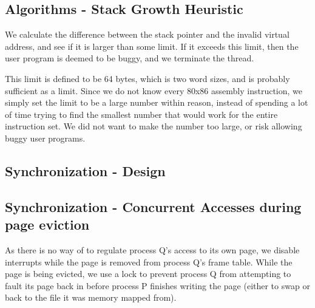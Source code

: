 
\subsection{Algorithms - Stack Growth Heuristic}


We calculate the difference between the stack pointer and the invalid virtual
address, and see if it is larger than some limit. If it exceeds this limit, then
the user program is deemed to be buggy, and we terminate the thread.

This limit is defined to be 64 bytes, which is two word sizes, and is probably
sufficient as a limit.  Since we do not know every 80x86 assembly instruction,
we simply set the limit to be a large number within reason, instead of spending
a lot of time trying to find the smallest number that would work for the entire
instruction set. We did not want to make the number too large, or risk allowing
buggy user programs.

\subsection{Synchronization - Design}


\subsection{Synchronization - Concurrent Accesses during page eviction}

As there is no way of to regulate process Q's access to its own page, we disable interrupts while the page is removed from process Q's frame table.
While the page is being evicted, we use a lock to prevent process Q from attempting to fault its page back in before process P finishes writing the page (either to swap or back to the file it was memory mapped from).

